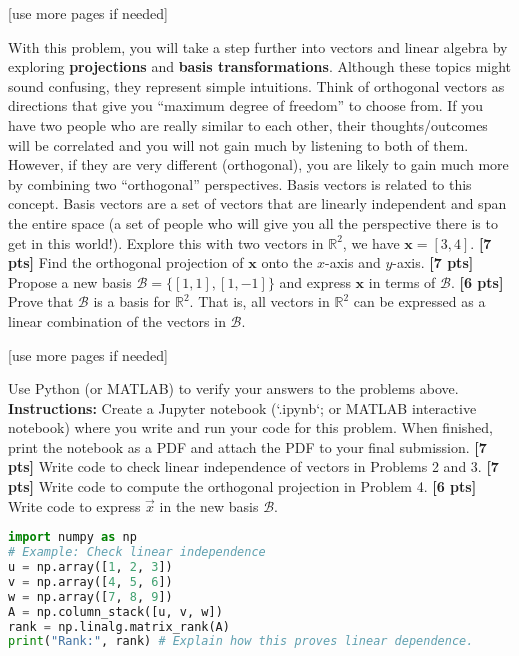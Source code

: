 \documentclass{ee102_pset} %
\begin{document}
\vspace*{\fill}
\begin{center}
[use more pages if needed]
\end{center}




 With this problem, you will take a step further into vectors and linear algebra by exploring \textbf{projections} and \textbf{basis transformations}. Although these topics might sound confusing, they represent simple intuitions. Think of orthogonal vectors as directions that give you ``maximum degree of freedom'' to choose from. If you have two people who are really similar to each other, their thoughts/outcomes will be correlated and you will not gain much by listening to both of them. However, if they are very different (orthogonal), you are likely to gain much more by combining two ``orthogonal'' perspectives. Basis vectors is related to this concept. Basis vectors are a set of vectors that are linearly independent and span the entire space (a set of people who will give you all the perspective there is to get in this world!). Explore this with two vectors in $\mathbb{R}^2$, we have $\textbf{x} = [3, 4]$.
\problempart \textbf{[7 pts]} Find the orthogonal projection of $\textbf{x}$ onto the $x$-axis and $y$-axis.
\problempart \textbf{[7 pts]} Propose a new basis $\mathcal{B} = \{[1, 1], [1, -1]\}$ and express $\textbf{x}$ in terms of $\mathcal{B}$.
\problempart \textbf{[6 pts]} Prove that $\mathcal{B}$ is a basis for $\mathbb{R}^2$. That is, all vectors in $\mathbb{R}^2$ can be expressed as a linear combination of the vectors in $\mathcal{B}$.

\vspace*{\fill}
\begin{center}
[use more pages if needed]
\end{center}



Use Python (or MATLAB) to verify your answers to the problems above.
\\ \textbf{Instructions:} Create a Jupyter notebook (`.ipynb`; or MATLAB interactive notebook) where you write and run your code for this problem. When finished, print the notebook as a PDF and attach the PDF to your final submission.
\problempart \textbf{[7 pts]} Write code to check linear independence of vectors in Problems 2 and 3.
\problempart \textbf{[7 pts]} Write code to compute the orthogonal projection in Problem 4.
\problempart \textbf{[6 pts]} Write code to express $\vec{x}$ in the new basis $\mathcal{B}$.

\begin{lstlisting}[language=Python, caption=Starter code for Problem 5]
import numpy as np
# Example: Check linear independence
u = np.array([1, 2, 3])
v = np.array([4, 5, 6])
w = np.array([7, 8, 9])
A = np.column_stack([u, v, w])
rank = np.linalg.matrix_rank(A)
print("Rank:", rank) # Explain how this proves linear dependence.
\end{lstlisting}
\end{document}
